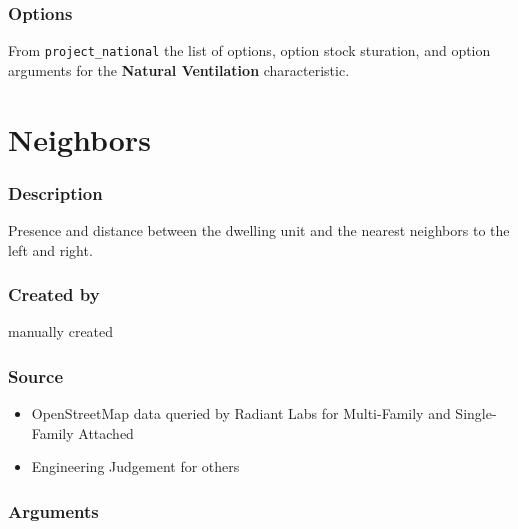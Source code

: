 \subsubsection{Options}\label{options-124}

From \texttt{project\_national} the list of options, option stock
sturation, and option arguments for the \textbf{Natural Ventilation}
characteristic.



\section{Neighbors}\label{neighbors}

\subsubsection{Description}\label{description-121}

Presence and distance between the dwelling unit and the nearest
neighbors to the left and right.

\subsubsection{Created by}\label{created-by-122}

manually created

\subsubsection{Source}\label{source-124}

\begin{itemize}
 
\item
  OpenStreetMap data queried by Radiant Labs for Multi-Family and
  Single-Family Attached
\item
  Engineering Judgement for others
\end{itemize}

\subsubsection{Arguments}\label{arguments-85}

